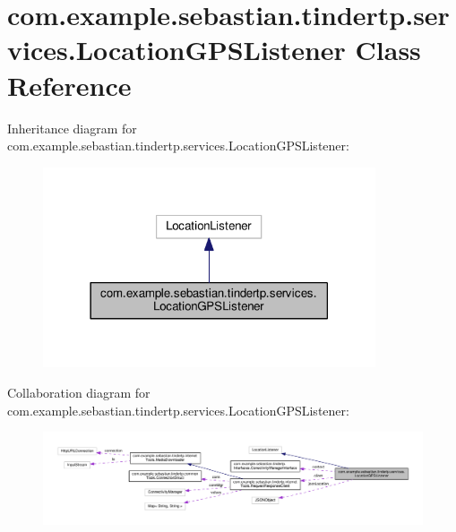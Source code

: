 \hypertarget{classcom_1_1example_1_1sebastian_1_1tindertp_1_1services_1_1LocationGPSListener}{}\section{com.\+example.\+sebastian.\+tindertp.\+services.\+Location\+G\+P\+S\+Listener Class Reference}
\label{classcom_1_1example_1_1sebastian_1_1tindertp_1_1services_1_1LocationGPSListener}


Inheritance diagram for com.\+example.\+sebastian.\+tindertp.\+services.\+Location\+G\+P\+S\+Listener\+:\nopagebreak
\begin{figure}[H]
\begin{center}
\leavevmode
\includegraphics[width=278pt]{classcom_1_1example_1_1sebastian_1_1tindertp_1_1services_1_1LocationGPSListener__inherit__graph}
\end{center}
\end{figure}


Collaboration diagram for com.\+example.\+sebastian.\+tindertp.\+services.\+Location\+G\+P\+S\+Listener\+:\nopagebreak
\begin{figure}[H]
\begin{center}
\leavevmode
\includegraphics[width=350pt]{classcom_1_1example_1_1sebastian_1_1tindertp_1_1services_1_1LocationGPSListener__coll__graph}
\end{center}
\end{figure}
